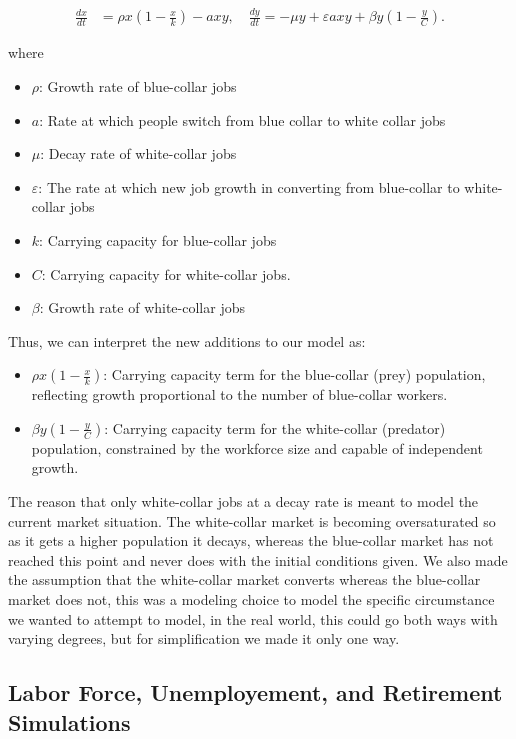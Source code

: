 \documentclass[11pt]{amsart}
\begin{document}
\begin{align}
    \frac{dx}{dt} &= \rho x \left(1-\frac{x}{k}\right) - a x y, \quad \frac{dy}{dt} = -\mu y + \varepsilon a x y + \beta y \left(1-\frac{y}{C}\right).
\end{align}

where 

\begin{itemize}
    \item $\rho$: Growth rate of blue-collar jobs
    \item $a$: Rate at which people switch from blue collar to white collar jobs
    \item $\mu$: Decay rate of white-collar jobs
    \item $\varepsilon$: The rate at which new job growth in converting from blue-collar to white-collar jobs
    \item $k$: Carrying capacity for blue-collar jobs
    \item $C$: Carrying capacity for white-collar jobs.
    \item $\beta$: Growth rate of white-collar jobs
\end{itemize}

Thus, we can interpret the new additions to our model as:

\begin{itemize}
    \item $\rho x (1-\frac{x}{k})$: Carrying capacity term for the blue-collar (prey) population, reflecting growth proportional to the number of blue-collar workers.
    \item $\beta y (1-\frac{y}{C})$: Carrying capacity term for the white-collar (predator) population, constrained by the workforce size and capable of independent growth.
\end{itemize}


The reason that only white-collar jobs at a decay rate is meant to model the current market situation. The white-collar market is becoming
oversaturated so as it gets a higher population it decays, whereas the blue-collar market has not reached this point and never does with the initial conditions given.
We also made the assumption that the white-collar market converts whereas the blue-collar market does not, this was a modeling choice to model the specific
circumstance we wanted to attempt to model, in the real world, this could go both ways with varying degrees, but for simplification we made it only one way.

\subsection{Labor Force, Unemployement, and Retirement Simulations}
\end{document}

